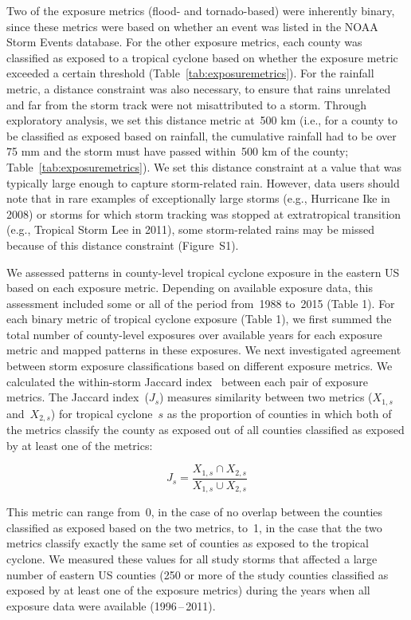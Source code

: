 Two of the exposure metrics (flood- and tornado-based) were inherently binary,
since these metrics were based on whether an event was listed in the NOAA Storm
Events database.  For the other exposure metrics, each county was classified as
exposed to a tropical cyclone based on whether the exposure metric exceeded a
certain threshold (Table~\ref{tab:exposuremetrics}). For the rainfall metric, a
distance constraint was also necessary, to ensure that rains unrelated and far
from the storm track were not misattributed to a storm. Through exploratory
analysis, we set this distance metric at~500 \si{\kilo\metre} (i.e., for a
county to be classified as exposed based on rainfall, the cumulative rainfall
had to be over 75 \si{\milli\metre} and the storm must have passed within~500
\si{\kilo\metre} of the county; Table~\ref{tab:exposuremetrics}). We set this
distance constraint at a value that was typically large enough to capture
storm-related rain. However, data users should note that in rare examples of
exceptionally large storms (e.g., Hurricane Ike in 2008) or storms for which
storm tracking was stopped at extratropical transition (e.g., Tropical Storm
Lee in 2011), some storm-related rains may be missed because of this distance
constraint (Figure~S1). 

We assessed patterns in county-level tropical cyclone exposure in the eastern
\ac{US} based on each exposure metric. Depending on available exposure data,
this assessment included some or all of the period from~1988 to~2015 (Table 1).
For each binary metric of tropical cyclone exposure (Table 1), we first summed
the total number of county-level exposures over available years for each
exposure metric and mapped patterns in these exposures. We next investigated
agreement between storm exposure classifications based on different exposure
metrics. We calculated the within-storm Jaccard
index~\parencite{jaccard1901distribution, jaccard1908nouvelles} between each
pair of exposure metrics. The Jaccard index~($J_s$) measures similarity between
two metrics ($X_{1,s}$ and~$X_{2,s}$) for tropical cyclone~$s$ as the
proportion of counties in which both of the metrics classify the county as
exposed out of all counties classified as exposed by at least one of the
metrics:

\begin{equation} 
J_s = \frac{X_{1,s} \cap X_{2,s}}{X_{1,s} \cup X_{2,s}}
\end{equation}

\noindent This metric can range from~0, in the case of no overlap between the
counties classified as exposed based on the two metrics, to~1, in the case that
the two metrics classify exactly the same set of counties as exposed to the
tropical cyclone. We measured these values for all study storms that affected a
large number of eastern \ac{US} counties (250 or more of the study counties
classified as exposed by at least one of the exposure metrics) during the years
when all exposure data were available (1996\,--\,2011).

